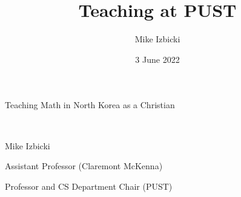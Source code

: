 \documentclass{beamer}
\author{Mike Izbicki}
\institute{mike@izbicki.me}
\title{Teaching at PUST}
\date{3 June 2022}
\newcommand{\imgslide}[1]{
{
\usebackgroundtemplate{\texttt{[image: \#1]} }
\begin{frame}{}
\end{frame}
}
}
\begin{document}
{
\begin{frame}{}
\color{darkred}
{
\raggedleft
\LARGE
Teaching Math in North Korea as a Christian

\Large

\vspace{0.2in}
~~~~~~~~~~~~~~~~~~~~~~\parbox{5in}{
Mike Izbicki

Assistant Professor (Claremont McKenna)

Professor and CS Department Chair (PUST)
}
}
    \vspace{2in}

%
%
\end{frame}
}


\imgslide{img/pust-cs-marching2}
\imgslide{img/icopust-me3}
\imgslide{img/students-working.png}
\imgslide{img/garden}
\imgslide{img/animals-goats2}
\imgslide{img/pust-food}
\imgslide{img/pust-sports}
\imgslide{img/sportsday-class3}
\imgslide{img/building-guesthouse}
\imgslide{img/church-1}
\end{document}
